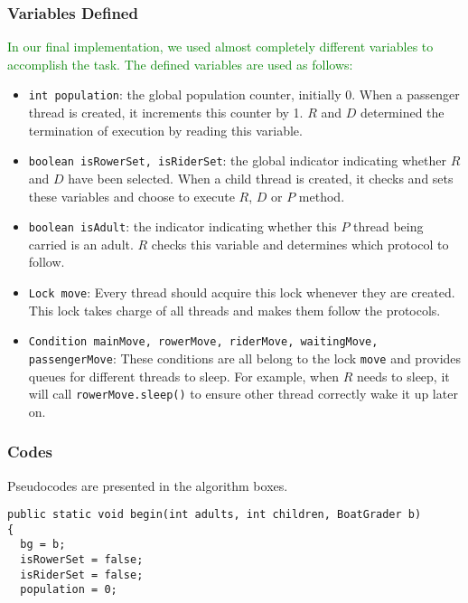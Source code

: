 \documentclass{article}
\begin{document}
\begin{spacing}{1.1}
\subsubsection{Variables Defined}
\textcolor{green}{In our final implementation, we used almost completely different variables to accomplish the task. The defined variables are used as follows:}
\begin{itemize}
  \item \texttt{int population}: the global population counter, initially 0. When a passenger thread is created, it increments this counter by 1. $R$ and $D$ determined the termination of execution by reading this variable.\\
  \item \texttt{boolean isRowerSet, isRiderSet}: the global indicator indicating whether $R$ and $D$ have been selected. When a child thread is created, it checks and sets these variables and choose to execute $R$, $D$ or $P$ method.\\
  \item \texttt{boolean isAdult}: the indicator indicating whether this $P$ thread being carried is an adult. $R$ checks this variable and determines which protocol to follow.\\
  \item \texttt{Lock move}: Every thread should acquire this lock whenever they are created. This lock takes charge of all threads and makes them follow the protocols.\\
  \item \texttt{Condition mainMove, rowerMove, riderMove, waitingMove, passengerMove}: These conditions are all belong to the lock \texttt{move} and provides queues for different threads to sleep. For example, when $R$ needs to sleep, it will call \texttt{rowerMove.sleep()} to ensure other thread correctly wake it up later on.\\
\end{itemize}

\subsubsection{Codes}
Pseudocodes are presented in the algorithm boxes.\\

\begin{lstlisting}
public static void begin(int adults, int children, BoatGrader b)
{
  bg = b;
  isRowerSet = false;
  isRiderSet = false;
  population = 0;
	

\end{lstlisting}
\end{spacing}
\end{document}
